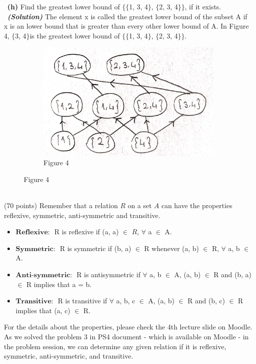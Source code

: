 \documentclass[a4 paper]{article}
\numberwithin{equation}{section}
\newcommand{\problem}[2]{~\\\fbox{\textbf{Problem #1}}\hfill (#2 points)\newline\newline}
\newcommand{\subproblem}[1]{~\newline\textbf{(#1)}}
\newcommand{\solution}{~\newline\textbf{\textit{(Solution)}} }
\newcommand{\0}{\mathbf{0}}
\begin{document}
\subproblem{h} Find the greatest lower bound of $\{\{$1, 3, 4$\}$, $\{$2, 3, 4$\}\}$,
if it exists.
\solution
The element x is called the greatest lower bound of the subset A if x is an lower bound that is greater than every other lower bound of A.
In Figure 4, $\{$3, 4$\}$is the greatest lower bound of $\{\{$1, 3, 4$\}$, $\{$2, 3, 4$\}\}$.
\begin{figure}[h!]
  \centering
  \begin{subfigure}[b]{0.4\linewidth}
    \includegraphics[width=\linewidth]{fig4.png}
    \caption{Figure 4}
  \end{subfigure}
\end{figure}
\newpage
\problem{3: Relations}{70}
Remember that a relation $R$ on a set $A$ can have the properties reflexive, symmetric, anti-symmetric and transitive.

\begin{itemize}
	\item $\textbf{Reflexive: }$ R is reflexive if (a, a) $\in$ $R$, $\forall$ a $\in$ A.
	\item $\textbf{Symmetric: }$ R is symmetric if (b, a) $\in$ R whenever (a, b) $\in$ R, $\forall$ a, b $\in$ A.
	\item $\textbf{Anti-symmetric: }$ R is antisymmetric if $\forall$ a, b $\in$ A, (a, b) $\in$ R and (b, a) $\in$ R implies that a = b.
	\item $\textbf{Transitive: }$ R is transitive if $\forall$ a, b, c $\in$ A, (a, b) $\in$ R and (b, c) $\in$ R implies that (a, c) $\in$ R.
\end{itemize}
For the details about the properties, please check the 4th lecture slide on Moodle. \\

As we solved the problem 3 in PS4 document - which is available on Moodle - in the problem session, we can determine any given relation if it is reflexive, symmetric, anti-symmetric, and transitive.\\
\end{document}
